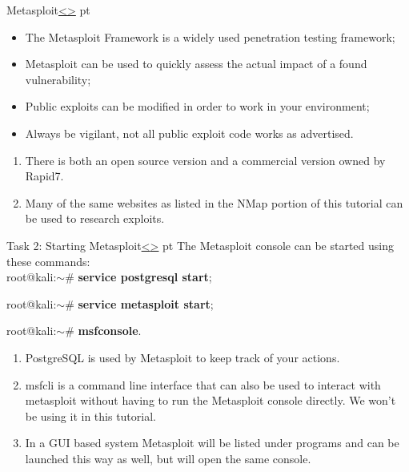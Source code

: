 \documentclass[12pt]{extarticle}
\newenvironment{instructionblock}{\Large\bgroup}{\egroup}
\begin{document}
\pagebreak

\begin{slide}{Metasploit\cite{b4}}{\hyperref[slide 7]{\textless}\hyperref[slide 9]{\textgreater}}
	 pt
	\begin{instructionblock}
		\begin{itemize}
			\item The Metasploit Framework is a widely used penetration testing framework;
			\item Metasploit can be used to quickly assess the actual impact of a found vulnerability;
			\item Public exploits can be modified in order to work in your environment;
			\item Always be vigilant, not all public exploit code works as advertised. 
		\end{itemize}
	\end{instructionblock}
\end{slide}
\begin{enumerate}
	\item There is both an open source version and a commercial version owned by Rapid7\cite{b4}.
	\item Many of the same websites as listed in the NMap portion of this tutorial can be used to research exploits\cite{b1}.
\end{enumerate}


\pagebreak

\begin{slide}{Task 2: Starting Metasploit\cite{b1}}{\hyperref[slide 8]{\textless}\hyperref[slide 10]{\textgreater}}
	 pt
	\begin{instructionblock}
		The Metasploit console can be started using these commands:\\
		
			root@kali:$\sim$\# \textbf{service postgresql start};
			
            root@kali:$\sim$\# \textbf{service metasploit start};
            
			root@kali:$\sim$\# \textbf{msfconsole}.
			
	\end{instructionblock}
\end{slide}
\begin{enumerate}
	\item PostgreSQL is used by Metasploit to keep track of your actions.
	\item msfcli is a command line interface that can also be used to interact with metasploit without having to run the Metasploit console directly. We won't be using it in this tutorial.
	\item In a GUI based system Metasploit will be listed under programs and can be launched this way as well, but will open the same console.
\end{enumerate}
\end{document}
